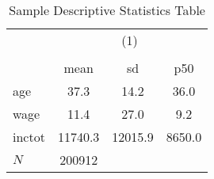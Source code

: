 \begin{table}[htbp]\centering
\def\sym#1{\ifmmode^{#1}\else\(^{#1}\)\fi}
\caption{Sample Descriptive Statistics Table\label{descriptive}}
\begin{tabular}{l*{1}{ccc}}
\hline\hline
            &\multicolumn{3}{c}{(1)}               \\
            &\multicolumn{3}{c}{}                  \\
            &        mean&          sd&         p50\\
\hline
age         &        37.3&        14.2&        36.0\\
wage        &        11.4&        27.0&         9.2\\
inctot      &     11740.3&     12015.9&      8650.0\\
\hline
\(N\)       &      200912&            &            \\
\hline\hline
\end{tabular}
\end{table}
